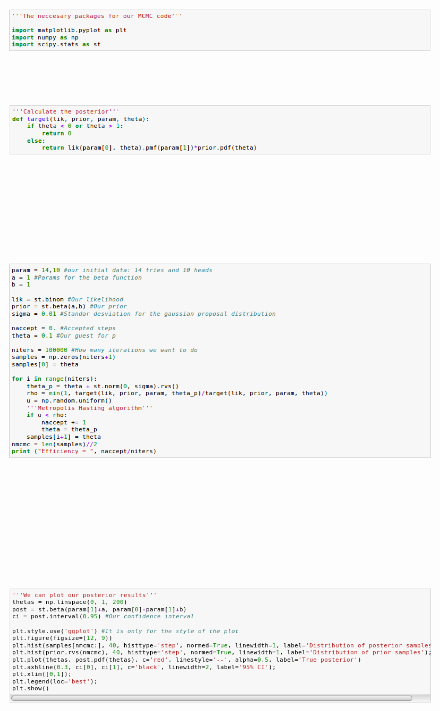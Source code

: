 \documentclass[onecolumn,           %
               showpacs,            %
               preprintnumbers,     %
               aps,                 %
               prl,          	    %
               letterpaper,             %
               superscriptaddress,      %
               nofootinbib,         %
               tightenlines,        %
               floats,floatfix      %
               ,usenatbib,
               ]{revtex4-1}
\begin{document}
\begin{figure}[h!]
\includegraphics[height=2cm]{c1.png}
\end{figure}
\begin{figure}[h!]
\includegraphics[height=2.339cm]{c2.png}
\end{figure}
\begin{figure}[h!]
\includegraphics[height=8.85cm]{c3.png}
\end{figure}
\begin{figure}[h!]
\includegraphics[height=5.21cm]{c4.png}
\end{figure}
\end{document}
